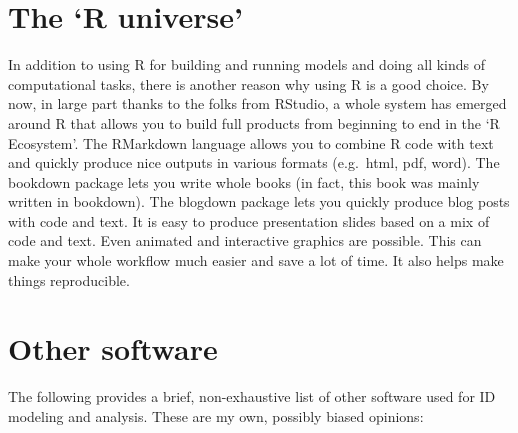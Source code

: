 \documentclass[]{book}
\theoremstyle{definition}
\theoremstyle{definition}
\theoremstyle{definition}
\theoremstyle{remark}
\begin{document}
\hypertarget{the-r-universe}{%
\section{The `R universe'}\label{the-r-universe}}

In addition to using R for building and running models and doing all
kinds of computational tasks, there is another reason why using R is a
good choice. By now, in large part thanks to the folks from RStudio, a
whole system has emerged around R that allows you to build full products
from beginning to end in the `R Ecosystem'. The RMarkdown language
allows you to combine R code with text and quickly produce nice outputs
in various formats (e.g.~html, pdf, word). The bookdown package lets you
write whole books (in fact, this book was mainly written in bookdown).
The blogdown package lets you quickly produce blog posts with code and
text. It is easy to produce presentation slides based on a mix of code
and text. Even animated and interactive graphics are possible. This can
make your whole workflow much easier and save a lot of time. It also
helps make things reproducible.

\hypertarget{other-software}{%
\section{Other software}\label{other-software}}

The following provides a brief, non-exhaustive list of other software
used for ID modeling and analysis. These are my own, possibly biased
opinions:
\end{document}
